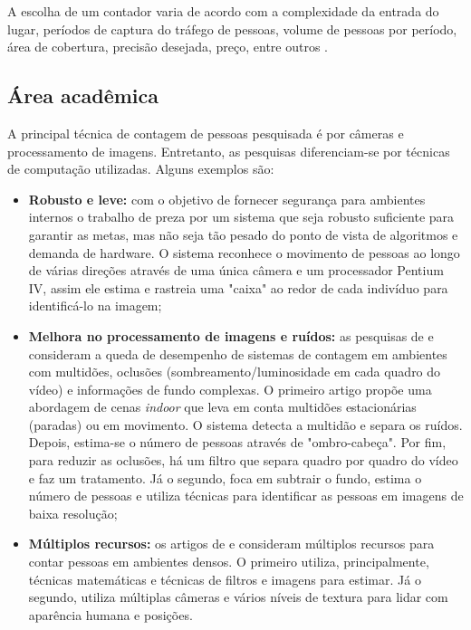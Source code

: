 A escolha de um contador varia de acordo com a complexidade da entrada do lugar, períodos de captura do tráfego de pessoas,
volume de pessoas por período, área de cobertura, precisão desejada, preço, entre outros \cite{trafsys} \cite{Axper2017}.

\subsection{Área acadêmica}
A principal técnica de contagem de pessoas pesquisada é por câmeras e processamento de imagens. Entretanto,
as pesquisas diferenciam-se por técnicas de computação utilizadas. Alguns exemplos são:

\begin{itemize}

  \item \textbf{Robusto e leve:} com o objetivo de fornecer segurança para ambientes internos
  o trabalho de  preza por um sistema que seja robusto suficiente para garantir as metas, mas
  não seja tão pesado do ponto de vista de algoritmos e demanda de hardware. O sistema reconhece o movimento de pessoas
  ao longo de várias direções através de uma única câmera e um processador Pentium IV, assim ele estima e rastreia uma "caixa"  ao redor de cada indivíduo
  para identificá-lo na imagem;

  \item \textbf{Melhora no processamento de imagens e ruídos:} as pesquisas de  e  consideram
  a queda de desempenho de sistemas de contagem em ambientes com multidões, oclusões (sombreamento/luminosidade
  em cada quadro do vídeo) e informações de fundo complexas. O primeiro artigo propõe uma abordagem de cenas \emph{indoor}
  que leva em conta multidões estacionárias (paradas) ou em movimento. O sistema detecta a multidão e separa
  os ruídos. Depois, estima-se o número de pessoas através de "ombro-cabeça". Por fim, para reduzir as oclusões,
  há um filtro que separa quadro por quadro do vídeo e faz um tratamento. Já o segundo, foca em subtrair o fundo, estima
  o número de pessoas e utiliza técnicas para identificar as pessoas em imagens de baixa resolução;

  \item \textbf{Múltiplos recursos:} os artigos de  e  consideram múltiplos recursos para contar pessoas
  em ambientes densos. O primeiro utiliza, principalmente, técnicas matemáticas e técnicas de filtros e imagens para estimar. Já o segundo, utiliza
  múltiplas câmeras e vários níveis de textura para lidar com aparência humana e posições.

\end{itemize}

